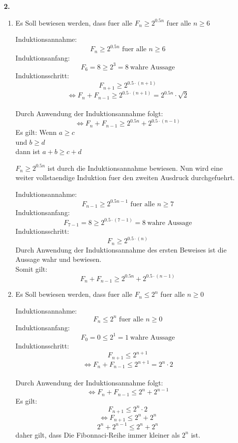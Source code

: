 \documentclass{article}
\begin{document}
\begin{enumerate}
    \item[\textbf{2.}]
        \begin{enumerate}
            \item
                Es Soll bewiesen werden, dass fuer alle $F_n \geq 2^{0.5n}$ fuer alle $n \geq 6$

                Induktionsannahme: 
                    \[F_n \geq 2^{0.5n} \text{ fuer alle } n \geq 6\]
                Induktionsanfang: 
                    \[ F_6 = 8 \geq 2^{3} = 8 \ \text{wahre Aussage}  \]
                Induktionsschritt:
                    \[ F_{n+1} \geq 2^{0.5 \cdot (n+1)} \]
                    \[ \Leftrightarrow F_{n} + F_{n-1} \geq 2^{0.5 \cdot (n+1)} = 2^{0.5n} \cdot \sqrt{2}\] \\
                Durch Anwendung der Induktionsannahme folgt:
                    \[ \Leftrightarrow F_{n} + F_{n-1} \geq 2^{0.5n} + 2^{0.5 \cdot (n-1)} \]
                Es gilt:
                Wenn $a \geq c$\\
                und $b \geq d$\\
                dann ist $a+b \geq c+d$

                $F_n \geq 2^{0.5n}$ ist durch die Induktionsannahme bewiesen.
                Nun wird eine weiter vollstaendige Induktion fuer den zweiten Ausdruck durchgefuehrt.

                Induktionsannahme: 
                    \[F_{n-1} \geq 2^{0.5n-1} \text{ fuer alle } n \geq 7\]
                Induktionsanfang: 
                    \[ F_{7-1} = 8 \geq 2^{0.5\cdot(7-1)} = 8 \ \text{wahre Aussage}  \]
                Induktionsschritt:
                    \[ F_{n} \geq 2^{0.5 \cdot (n)} \]
                Durch Anwendung der Induktionsannahme des ersten Beweises ist die Aussage wahr und bewiesen. \\
                Somit gilt:
                \[F_{n} + F_{n-1} \geq 2^{0.5n} + 2^{0.5 \cdot (n-1)} \]

            \item
                Es Soll bewiesen werden, dass fuer alle $F_n \leq 2^{n}$ fuer alle $n \geq 0$

                Induktionsannahme: 
                    \[F_n \leq 2^{n} \text{ fuer alle } n \geq 0\]
                Induktionsanfang: 
                    \[ F_0 = 0 \leq 2^{1} = 1 \ \text{wahre Aussage}  \]
                Induktionsschritt:
                    \[ F_{n+1} \leq 2^{n+1} \]
                    \[ \Leftrightarrow F_{n} + F_{n-1} \leq 2^{n+1} = 2^{n} \cdot 2\] \\
                Durch Anwendung der Induktionsannahme folgt:
                    \[ \Leftrightarrow F_{n} + F_{n-1} \leq 2^{n} + 2^{n-1} \]
                    Es gilt:
                    \[ F_{n+1} \leq 2^n \cdot 2 \]
                    \[ \Leftrightarrow F_{n+1} \leq 2^n + 2^n \]
                    \[ 2^{n} + 2^{n-1} \leq 2^n + 2^n \]
                    daher gilt, dass Die Fibonnaci-Reihe immer kleiner als $2^n$ ist. 


\end{enumerate}
\end{enumerate}
\end{document}
